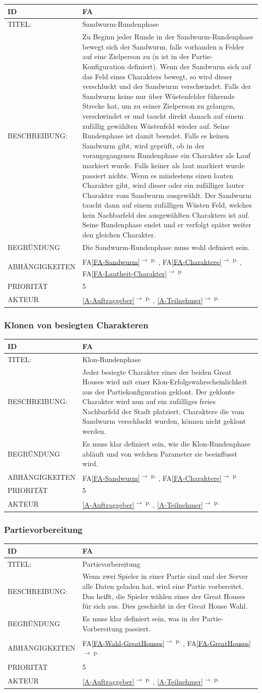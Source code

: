 \documentclass[12pt]{article}
\newcounter{fa}
\newcommand{\fa}[7]{
\refstepcounter{fa}\label{#7}
\begin{tabularx}{16cm}{l|X}
\textbf{ID} & \textbf{FA\arabic{fa}} \\
\hline
TITEL: & #1 \\
\hline
BESCHREIBUNG: & #2 \\
\hline
BEGRÜNDUNG & #3 \\ 
\hline
ABHÄNGIGKEITEN & #4\\ 
\hline 
PRIORITÄT & #5\\ 
\hline 
AKTEUR & #6
\end{tabularx}
\vspace*{0.75cm}
}
\newcommand{\rref}[1]{\ref{#1}\textsuperscript{$\rightarrow$ p. \pageref{#1}}}
\newcommand{\faref}[1]{FA\ref{#1}\textsuperscript{$\rightarrow$ p. \pageref{#1}}}
\begin{document}
\fa{Sandwurm-Rundenphase}{ Zu Beginn jeder Runde in der Sandwurm-Rundenphase bewegt sich der Sandwurm, falls vorhanden n Felder auf eine Zielperson zu (n ist in der Partie-Konfiguration definiert). Wenn der Sandwurm sich auf das Feld eines Charakters bewegt, so wird dieser verschluckt und der Sandwurm verschwindet. Falls der Sandwurm keine nur über Wüstenfelder führende Strecke hat, um zu seiner Zielperson zu gelangen, verschwindet er und taucht direkt danach auf einem zufällig gewählten Wüstenfeld wieder auf. Seine Rundenphase ist damit beendet. Falls es keinen Sandwurm gibt, wird geprüft, ob in der vorangegangenen Rundenphase ein Charakter als Lauf markiert wurde. Falls keiner als laut markiert wurde passiert nichts. Wenn es mindestens einen lauten Charakter gibt, wird dieser oder ein zufälliger lauter Charakter vom Sandwurm ausgewählt. Der Sandwurm taucht dann auf einem zufälligen Wüsten Feld, welches kein Nachbarfeld des ausgewählten Charakters ist auf. Seine Rundenphase endet und er verfolgt später weiter den gleichen Charakter.}{Die Sandwurm-Rundenphase muss wohl definiert sein.}{\faref{FA-Sandwurm}, \faref{FA-Charaktere}, \faref{FA-Lautheit-Charakter}}{5}{\rref{A-Auftraggeber}, \rref{A-Teilnehmer}}{FA-Phase-Sandwurm}

\subsubsection*{Klonen von besiegten Charakteren}

\fa{Klon-Rundenphase}{Jeder besiegte Charakter eines der beiden Great Houses wird mit einer Klon-Erfolgswahrscheinlichkeit aus der Partiekonfiguration geklont. Der geklonte Charakter wird nun auf ein zufälliges freies Nachbarfeld der Stadt platziert. Charaktere die vom Sandwurm verschluckt wurden, können nicht geklont werden.}{Es muss klar definiert sein, wie die Klon-Rundenphase abläuft und von welchen Parameter sie beeinflusst wird.}{\faref{FA-Sandwurm}, \faref{FA-Charaktere}}{5}{\rref{A-Auftraggeber}, \rref{A-Teilnehmer}}{FA-Phase-Klon}

\subsubsection*{Partievorbereitung}

\fa{Partievorbereitung}{Wenn zwei Spieler in einer Partie sind und der Server alle Daten geladen hat, wird eine Partie vorbereitet. Das heißt, die Spieler wählen eines der Great Houses für sich aus. Dies geschieht in der Great House Wahl.}{Es muss klar definiert sein, was in der Partie-Vorbereitung passiert. }{\faref{FA-Wahl-GreatHouses}, \faref{FA-GreatHouses}}{5}{\rref{A-Auftraggeber}, \rref{A-Teilnehmer}}{FA-Partievorbereitung}
\end{document}
